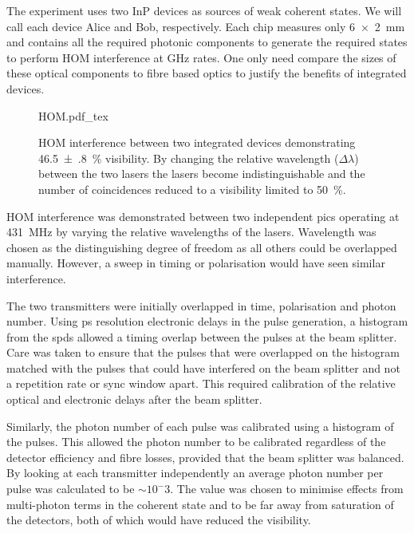 The experiment uses two \ac{InP} devices as sources of weak coherent states. We will call each device Alice and Bob, respectively. Each chip measures only \SI[product-units=power]{6x2}{mm} and contains all the required photonic components to generate the required states to perform \ac{HOM} interference at GHz rates. One only need compare the sizes of these optical components to fibre based optics to justify the benefits of integrated devices.

\begin{figure}[tbp]
	\centering
	\def\svgwidth{0.8\textwidth} 
	{HOM.pdf_tex}
	\caption[Hong-Ou-Mandel interference between integrated devices]{\ac{HOM} interference between two integrated devices demonstrating \SI{46.5(8)}{\%} visibility. By changing the relative wavelength ($\Delta\lambda$) between the two lasers the lasers become indistinguishable and the number of coincidences reduced to a visibility limited to \SI{50}{\percent}.}
	\label{fig:HOM}
\end{figure}

\acl{HOM} interference was demonstrated between two independent \acp{pic} operating at \SI{431}{\MHz} by varying the relative wavelengths of the lasers. Wavelength was chosen as the distinguishing degree of freedom as all others could be overlapped manually. However, a sweep in timing or polarisation would have seen similar interference. 

The two transmitters were initially overlapped in time, polarisation and photon number. Using ps resolution electronic delays in the pulse generation, a histogram from the \acp{spd} allowed a timing overlap between the pulses at the beam splitter. Care was taken to ensure that the pulses that were overlapped on the histogram matched with the pulses that could have interfered on the beam splitter and not a repetition rate or sync window apart. This required calibration of the relative optical and electronic delays after the beam splitter. 

Similarly, the photon number of each pulse was calibrated using a histogram of the pulses. This allowed the photon number to be calibrated regardless of the detector efficiency and fibre losses, provided that the beam splitter was balanced. By looking at each transmitter independently an average photon number per pulse was calculated to be $\sim 10^-3$. The value was chosen to minimise effects from multi-photon terms in the coherent state and to be far away from saturation of the detectors, both of which would have reduced the visibility.

